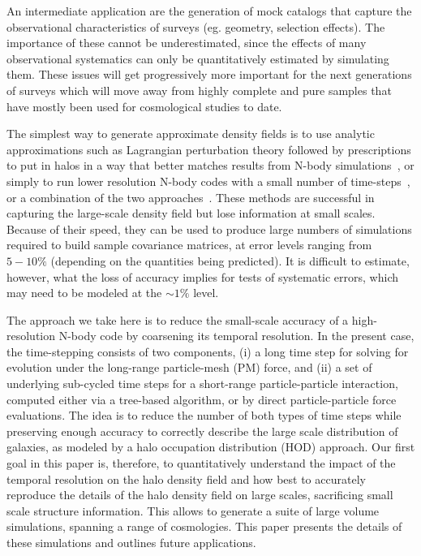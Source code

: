 An intermediate application are the generation of mock catalogs that capture
the observational characteristics of surveys (eg. geometry, selection 
effects). The importance of these cannot be underestimated, since the effects
of many observational systematics can only be quantitatively estimated 
by simulating them. These issues will get progressively more important
for the next generations of surveys which will move away from highly 
complete and pure samples that have mostly been used for cosmological studies 
to date.

The simplest way to generate approximate density fields is to use
analytic approximations such as Lagrangian perturbation theory followed
by prescriptions to put in halos in a way that better matches results
from N-body simulations~\cite{2013MNRAS.428.1036M,2014arXiv1401.4171M},
or simply to run lower resolution N-body codes with a small number
of time-steps~\cite{2013JCAP...06..036T}, or a combination of the
two approaches~\cite{2014MNRAS.437.2594W}. These methods are successful
in capturing the large-scale density field but lose information at
small scales. Because of their speed, they can be used to produce
large numbers of simulations required to build sample covariance matrices,
at error levels ranging from $5-10\%$ (depending on the quantities
being predicted). It is difficult to estimate, however, what the loss
of accuracy implies for tests of systematic errors, which may need
to be modeled at the $\sim1\%$ level.

The approach we take here is to reduce the small-scale accuracy of
a high-resolution N-body code by coarsening its temporal resolution.
In the present case, the time-stepping consists of two components,
(i) a long time step for solving for evolution under the long-range
particle-mesh (PM) force, and (ii) a set of underlying sub-cycled
time steps for a short-range particle-particle interaction, computed
either via a tree-based algorithm, or by direct particle-particle
force evaluations. The idea is to reduce the number of both types
of time steps while preserving enough accuracy to correctly describe
the large scale distribution of galaxies, as modeled by a halo occupation
distribution (HOD) approach. 
Our first goal in this paper is, therefore, to quantitatively understand
the impact of the temporal resolution on the halo density field and
how best to 
accurately reproduce the details of the halo density field on large
scales, sacrificing small scale structure information. 
This allows to generate a suite of large volume simulations, spanning
a range of cosmologies. This paper presents the details of these simulations
and outlines future applications.

